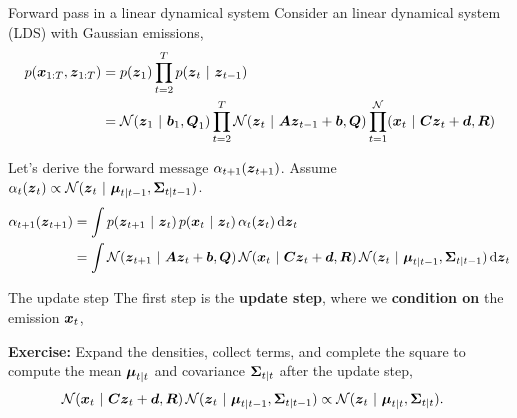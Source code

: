 \documentclass[aspectratio=169]{beamer}
\begin{document}
    
\begin{frame}[t]{Forward pass in a linear dynamical system}
    Consider an linear dynamical system (LDS) with Gaussian emissions,
    \begin{align}
        p(\boldsymbol{x}_{1:T}, \boldsymbol{z}_{1:T}) &= p(\boldsymbol{z}_1) \prod_{t=2}^T p(\boldsymbol{z}_t ~\vert~ \boldsymbol{z}_{t-1}) \\
        &= \mathcal{N}(\boldsymbol{z}_1 ~\vert~ \boldsymbol{b}_1, \boldsymbol{Q}_1) \prod_{t=2}^T \mathcal{N}(\boldsymbol{z}_t ~\vert~ \boldsymbol{A} \boldsymbol{z}_{t-1} + \boldsymbol{b}, \boldsymbol{Q}) \prod_{t=1}^ {\mathcal{N}}(\boldsymbol{x}_t ~\vert~ \boldsymbol{C} \boldsymbol{z}_t + \boldsymbol{d}, \boldsymbol{R})
    \end{align}
    
    Let's derive the forward message $\alpha_{t+1}(\boldsymbol{z}_{t+1})$. Assume $\alpha_{t}(\boldsymbol{z}_{t}) \propto \mathcal{N}(\boldsymbol{z}_{t} ~\vert~ \boldsymbol{\mu}_{t|t-1}, \boldsymbol{\Sigma}_{t|t-1})$.
    \begin{align}
        \alpha_{t+1}(\boldsymbol{z}_{t+1}) 
        &= \int p(\boldsymbol{z}_{t+1} ~\vert~ \boldsymbol{z}_{t}) \, p(\boldsymbol{x}_{t} ~\vert~ \boldsymbol{z}_{t}) \, \alpha_{t}(\boldsymbol{z}_{t}) \mathop{}\!\mathrm{d} {\boldsymbol{z}_{t}} \\
        &= \int \mathcal{N}(\boldsymbol{z}_{t+1} ~\vert~ \boldsymbol{A} \boldsymbol{z}_{t} + \boldsymbol{b}, \boldsymbol{Q}) \, \mathcal{N}(\boldsymbol{x}_{t} ~\vert~ \boldsymbol{C} \boldsymbol{z}_{t} + \boldsymbol{d}, \boldsymbol{R}) \, \mathcal{N}(\boldsymbol{z}_{t} ~\vert~ \boldsymbol{\mu}_{t|t-1}, \boldsymbol{\Sigma}_{t|t-1}) \mathop{}\!\mathrm{d} \boldsymbol{z}_{t}
    \end{align}
\end{frame}
    
\begin{frame}[t]{The update step}
    The first step is the \textbf{update step}, where we \textbf{condition on} the emission $\boldsymbol{x}_t$,
    
    \textbf{Exercise:} Expand the densities, collect terms, and complete the square to compute the mean $\boldsymbol{\mu}_{t|t}$ and covariance $\boldsymbol{\Sigma}_{t|t}$ after the update step,
    \begin{align}
        \mathcal{N}(\boldsymbol{x}_{t} ~\vert~ \boldsymbol{C} \boldsymbol{z}_{t} + \boldsymbol{d}, \boldsymbol{R}) \, \mathcal{N}(\boldsymbol{z}_{t} ~\vert~ \boldsymbol{\mu}_{t|t-1}, \boldsymbol{\Sigma}_{t|t-1}) 
        &\propto \mathcal{N}(\boldsymbol{z}_t ~\vert~ \boldsymbol{\mu}_{t|t}, \boldsymbol{\Sigma}_{t|t}).
    \end{align}
\end{frame}
    
\end{document}
